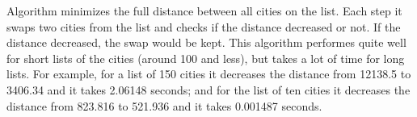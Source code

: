\documentclass[a4paper, 12pt]{article}
\begin{document}
\begin{enumerate}
	
	Algorithm minimizes the full distance between all cities on the list. Each step it swaps two cities from the list and checks if the distance decreased or not. If the distance decreased, the swap would be kept. This algorithm performes quite well for short lists of the cities (around 100 and less), but takes a lot of time for long lists.  For example, for a list of 150 cities it decreases the distance from 12138.5 to 3406.34 and it takes 2.06148 seconds; and for the list of ten cities it decreases the distance from 823.816 to 521.936 and it takes 0.001487 seconds.
	
    \end{enumerate}
    
\end{document}
